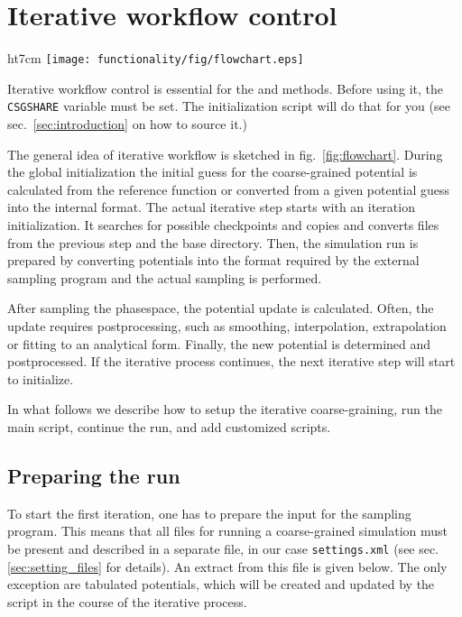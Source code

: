 \chapter{Iterative workflow control}
\label{sec:iterative_workflow}

\begin{wrapfigure}{ht}{7cm}  
\texttt{[image: functionality/fig/flowchart.eps]}
  \caption{
    \label{fig:flowchart}
    Block-scheme of the workflow control for the iterative methods. The most time-consuming parts are marked in red.
  }
\end{wrapfigure}
Iterative workflow control is essential for the \ibi and \imc methods. Before using it, the \texttt{CSGSHARE} variable must be set. The \votca initialization script will do that for you (see sec.~\ref{sec:introduction} on how to source it.)

The general idea of iterative workflow is sketched in fig.~\ref{fig:flowchart}. During the global initialization the initial guess for the coarse-grained potential is calculated from the reference function or converted from a given potential guess into the internal format. The actual iterative step starts with an iteration initialization. It searches for possible checkpoints and copies and converts files from the previous step and the base directory. Then, the simulation run is prepared by converting potentials into the format required by the external sampling program and the actual sampling is performed. 

After sampling the phasespace, the potential update is calculated. Often, the update requires postprocessing, such as smoothing, interpolation, extrapolation or fitting to an analytical form. 
Finally, the new potential is determined and postprocessed. If the iterative process continues, the next iterative step will start to initialize.

In what follows we describe how to setup the iterative coarse-graining, run the main script, continue the run, and add customized scripts. 

\section{Preparing the run}
\label{sec:preparing_the_run}
To start the first iteration, one has to prepare the input for the sampling program. This means that all files for running a coarse-grained simulation must be present and described in a separate \xml file, in our case \texttt{settings.xml} (see sec. \ref{sec:setting_files} for details). An extract from this file is given below. The only exception are tabulated potentials, which will be created and updated by the script in the course of the iterative process.

